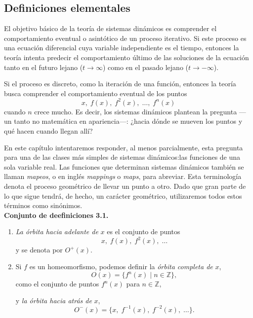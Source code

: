 \documentclass[10pt,a4paper]{article}
\title{}
\author{}
\begin{document}
\maketitle
\newpage
\subsection*{Definiciones elementales}

El objetivo básico de la teoría de sistemas dinámicos es comprender el comportamiento eventual o asintótico de un proceso iterativo. Si este proceso es una ecuación diferencial cuya variable independiente es el tiempo, entonces la teoría intenta predecir el comportamiento último de las soluciones de la ecuación tanto en el futuro lejano ($t \to \infty$) como en el pasado lejano ($t \to -\infty$).  

Si el proceso es discreto, como la iteración de una función, entonces la teoría busca comprender el comportamiento eventual de los puntos 
\[
x,\; f(x),\; f^{2}(x),\; \dots,\; f^{n}(x)
\]
cuando $n$ crece mucho. Es decir, los sistemas dinámicos plantean la pregunta —un tanto no matemática en apariencia—: ¿hacia dónde se mueven los puntos y qué hacen cuando llegan allí?  

En este capítulo intentaremos responder, al menos parcialmente, esta pregunta para una de las clases más simples de sistemas dinámicos:las funciones de una sola variable real. Las funciones que determinan sistemas dinámicos también se llaman \emph{mapeos}, o en inglés \emph{mappings} o \emph{maps}, para abreviar. Esta terminología denota el proceso geométrico de llevar un punto a otro. Dado que gran parte de lo que sigue tendrá, de hecho, un carácter geométrico, utilizaremos todos estos términos como sinónimos.
\\

\textbf{Conjunto de deefiniciones 3.1.} 
\begin{enumerate}
	\item \textit{La órbita hacia adelante de} $x$ es el conjunto de puntos 
\[
x,\; f(x),\; f^{2}(x),\; \dots
\]
y se denota por $O^{+}(x)$.  

	\item Si $f$ es un homeomorfismo, podemos definir la \textit{órbita completa de }$x$, 
\[
O(x) = \{ f^{n}(x) \;|\; n \in \mathbb{Z} \},
\]
como el conjunto de puntos $f^{n}(x)$ para $n \in \mathbb{Z}$,  

y \textit{la órbita hacia atrás de} $x$,
\[
O^{-}(x) = \{x,\; f^{-1}(x),\; f^{-2}(x),\; \dots \}.
\]
\end{enumerate}
\end{document}
